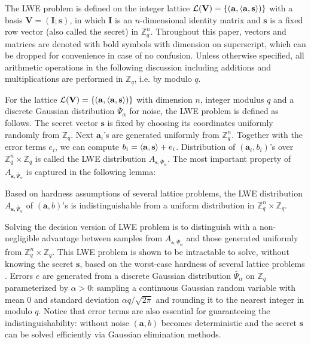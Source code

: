 The LWE problem is defined on the integer lattice $\mathcal{L}(\mathbf{V}) = \{(\mathbf{a},\langle\mathbf{a},\mathbf{s}\rangle)\}$ with a basis $\mathbf{V}=(\mathbf{I};\mathbf{s})$, in which $\mathbf{I}$ is an $n$-dimensional identity matrix and $\mathbf{s}$ is a fixed row vector (also called the secret) in $\mathbb{Z}_q^n$.
Throughout this paper, vectors and matrices are denoted with bold symbols with dimension on superscript, which can be dropped for convenience in case of no confusion.
Unless otherwise specified, all arithmetic operations in the following discussion including additions and multiplications are performed in $\mathbb{Z}_q$, i.e. by modulo $q$.


For the lattice $\mathcal{L}(\mathbf{V})= \{(\mathbf{a},\langle\mathbf{a},\mathbf{s}\rangle)\}$ with dimension $n$, integer modulus $q$ and a discrete Gaussian distribution $\bar{\Psi}_\alpha$ for noise, the LWE problem is defined as follows.
The secret vector $\mathbf{s}$ is fixed by choosing its coordinates uniformly randomly from $\mathbb{Z}_q$. 
Next $\mathbf{a}_i$'s are generated uniformly from $\mathbb{Z}_q^n$.
Together with the error terms $e_i$, we can compute $b_i = \langle\mathbf{a},\mathbf{s}\rangle + e_i$. 
Distribution of $(\mathbf{a}_i,b_i)$'s over $\mathbb{Z}_q^n\times\mathbb{Z}_q$ is called the LWE distribution $A_{\mathbf{s},\bar{\Psi}_\alpha}$.
The most important property of $A_{\mathbf{s},\bar{\Psi}_\alpha}$ is captured in the following lemma:
\begin{lemma}
\label{lem:LWE_dist}
Based on hardness assumptions of several lattice problems, the LWE distribution $A_{\mathbf{s},\bar{\Psi}_\alpha}$ of $(\mathbf{a},b)$'s is indistinguishable from a uniform distribution in $\mathbb{Z}_q^n\times\mathbb{Z}_q$.
\end{lemma}


Solving the decision version of LWE problem is to distinguish with a non-negligible advantage between samples from $A_{\mathbf{s},\bar{\Psi}_\alpha}$ and those generated uniformly from $\mathbb{Z}_q^n\times\mathbb{Z}_q$. 
This LWE problem is shown to be intractable to solve, without knowing the secret $\mathbf{s}$, based on the worst-case hardness of several lattice problems \cite{regev2009lattices}.
Errors $e$ are generated from a discrete Gaussian distribution $\bar{\Psi}_\alpha$ on $\mathbb{Z}_q$ parameterized by $\alpha >0$: sampling a continuous Gaussian random variable with mean $0$ and standard deviation $\alpha q/\sqrt{2\pi}$ and rounding it to the nearest integer in modulo $q$.  
Notice that error terms are also essential for guaranteeing the indistinguishability: without noise $(\mathbf{a},b)$ becomes deterministic and the secret $\mathbf{s}$ can be solved efficiently via Gaussian elimination methods.


